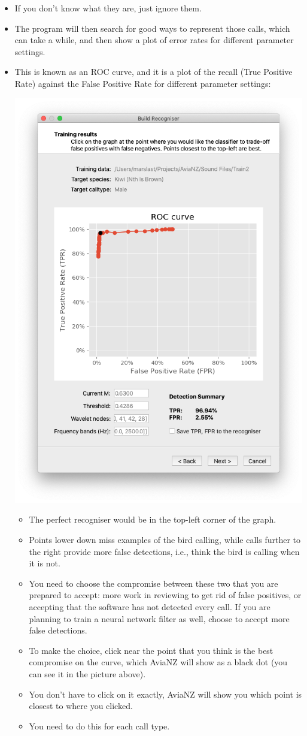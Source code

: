 \documentclass{scrartcl}
\begin{document}
\begin{itemize}
\item If you don't know what they are, just ignore them. 
\item The program will then search for good ways to represent those calls, which can take a while, and then show a plot of error rates for different parameter settings. 
\item This is known as an ROC curve, and it is a plot of the recall (True Positive Rate) against the False Positive Rate for different parameter settings:
\begin{center}
    \includegraphics[width=.7\textwidth]{Figures/BuildRecogniser4a}
\end{center}

\begin{itemize}
\item The perfect recogniser would be in the top-left corner of the graph. 
\item Points lower down miss examples of the bird calling, while calls further to the right provide more false detections, i.e., think the bird is calling when it is not. 
\item You need to choose the compromise between these two that you are prepared to accept: more work in reviewing to get rid of false positives, or accepting that the software has not detected every call. If you are planning to train a neural network filter as well, choose to accept more false detections.
\item To make the choice, click near the point that you think is the best compromise on the curve, which AviaNZ will show as a black dot (you can see it in the picture above). 
\item You don't have to click on it exactly, AviaNZ will show you which point is closest to where you clicked. 
\item You need to do this for each call type. 
\end{itemize}


\end{itemize}
\end{document}
